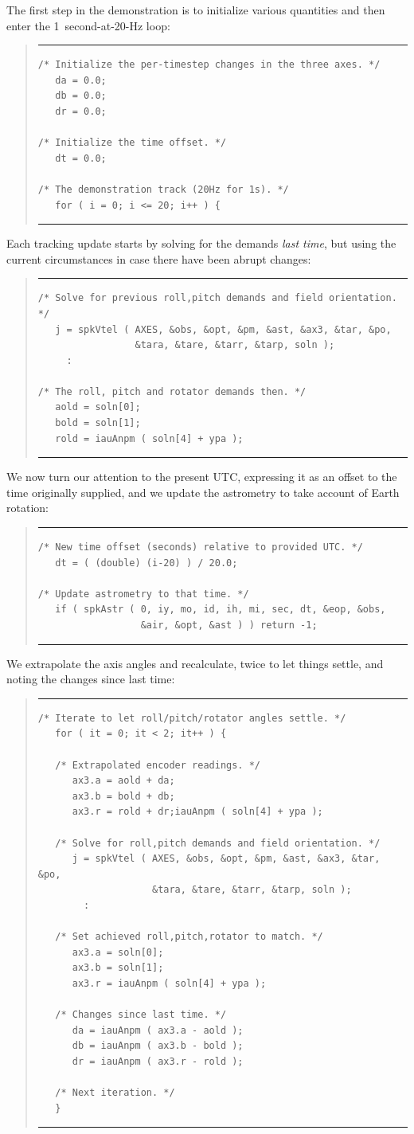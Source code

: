 \documentclass[11pt,fleqn,twoside,\paper]{article}
\renewcommand{\_}{{\tt\char'137}}     %
\newcommand{\scode}     {\goodbreak
                         \begin{quote}
                         \vspace{-6ex}
                         \rule[-2ex]{36em}{0.03ex}}
\newcommand{\ecode}     {\rule[2ex]{36em}{0.03ex}
                         \end{quote}
                         \vspace{-4ex}
                         \goodbreak}
\begin{document}
The first step in the demonstration is to initialize various
quantities and then enter the 1~second-at-20-Hz loop:
\scode\begin{verbatim}
/* Initialize the per-timestep changes in the three axes. */
   da = 0.0;
   db = 0.0;
   dr = 0.0;

/* Initialize the time offset. */
   dt = 0.0;

/* The demonstration track (20Hz for 1s). */
   for ( i = 0; i <= 20; i++ ) {
\end{verbatim}\ecode
Each tracking update starts by solving for the demands {\it last time},
but using the current circumstances in case there have
been abrupt changes:
\scode\begin{verbatim}
/* Solve for previous roll,pitch demands and field orientation. */
   j = spkVtel ( AXES, &obs, &opt, &pm, &ast, &ax3, &tar, &po,
                 &tara, &tare, &tarr, &tarp, soln );
     :

/* The roll, pitch and rotator demands then. */
   aold = soln[0];
   bold = soln[1];
   rold = iauAnpm ( soln[4] + ypa );
\end{verbatim}\ecode
We now turn our attention to the present UTC, expressing it as an
offset to the time originally supplied, and we update the astrometry
to take account of Earth rotation:
\scode\begin{verbatim}
/* New time offset (seconds) relative to provided UTC. */
   dt = ( (double) (i-20) ) / 20.0;

/* Update astrometry to that time. */
   if ( spkAstr ( 0, iy, mo, id, ih, mi, sec, dt, &eop, &obs,
                  &air, &opt, &ast ) ) return -1;
\end{verbatim}\ecode
We extrapolate the axis angles and recalculate, twice to let
things settle, and noting the changes since last time:
\scode\begin{verbatim}
/* Iterate to let roll/pitch/rotator angles settle. */
   for ( it = 0; it < 2; it++ ) {

   /* Extrapolated encoder readings. */
      ax3.a = aold + da;
      ax3.b = bold + db;
      ax3.r = rold + dr;iauAnpm ( soln[4] + ypa );

   /* Solve for roll,pitch demands and field orientation. */
      j = spkVtel ( AXES, &obs, &opt, &pm, &ast, &ax3, &tar, &po,
                    &tara, &tare, &tarr, &tarp, soln );
        :

   /* Set achieved roll,pitch,rotator to match. */
      ax3.a = soln[0];
      ax3.b = soln[1];
      ax3.r = iauAnpm ( soln[4] + ypa );

   /* Changes since last time. */
      da = iauAnpm ( ax3.a - aold );
      db = iauAnpm ( ax3.b - bold );
      dr = iauAnpm ( ax3.r - rold );

   /* Next iteration. */
   }
\end{verbatim}\ecode
\end{document}
